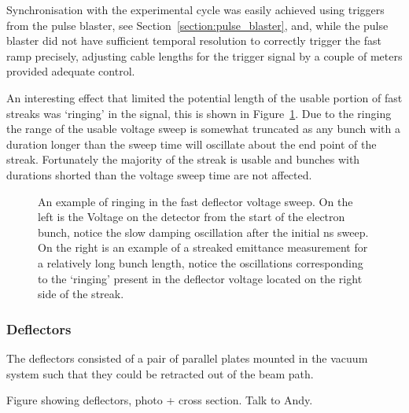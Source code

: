 Synchronisation with the experimental cycle was easily achieved using triggers from the pulse blaster, see Section~\ref{section:pulse_blaster}, and, while the pulse blaster did not have sufficient temporal resolution to correctly trigger the fast ramp precisely, adjusting cable lengths for the trigger signal by a couple of meters provided adequate control.

An interesting effect that limited the potential length of the usable portion of fast streaks was `ringing' in the signal, this is shown in Figure~\ref{figure:ringing}.
Due to the ringing the range of the usable voltage sweep is somewhat truncated as any bunch with a duration longer than the sweep time will oscillate about the end point of the streak.
Fortunately the majority of the streak is usable and bunches with durations shorted than the voltage sweep time are not affected.

\begin{figure}
    \center
    
    \caption{An example of ringing in the fast deflector voltage sweep. On the left is the Voltage on the detector from the start of the electron bunch, notice the slow damping oscillation after the initial \unit[10]{ns} sweep. On the right is an example of a streaked emittance measurement for a relatively long bunch length, notice the oscillations corresponding to the `ringing' present in the deflector voltage located on the right side of the streak.}
    \label{figure:ringing}
\end{figure}

\subsubsection{Deflectors}

The deflectors consisted of a pair of parallel plates mounted in the vacuum system such that they could be retracted out of the beam path.

{\color{red}Figure showing deflectors, photo + cross section. Talk to Andy.}


